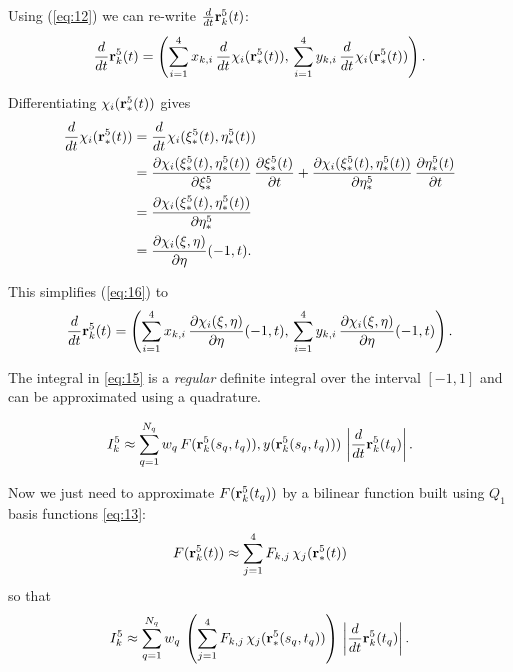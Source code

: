 \documentclass[11pt]{article}
\begin{document}
Using (\ref{eq:12}) we can re-write $\frac{d}{dt} \mathbf{r}_{k}^{5}(t)$:
\begin{equation}
\label{eq:16}
\frac{d}{dt} \mathbf{r}_{k}^{5}(t) = \left( \sum_{i=1}^{4} x_{k,i}\, \frac{d}{dt}\chi_{i}(\mathbf{r}_{*}^{5}(t)),\,
                                 \sum_{i=1}^{4} y_{k,i}\, \frac{d}{dt}\chi_{i}(\mathbf{r}_{*}^{5}(t))  \right).
\end{equation}

Differentiating $\chi_{i}(\mathbf{r}_{*}^{5}(t))$ gives
\begin{equation}
  \label{eq:17}
  \begin{aligned}
      \frac{d}{dt}\chi_{i}(\mathbf{r}_{*}^{5}(t)) &= \frac{d}{dt}\chi_{i}(\xi_{*}^{5}(t), \eta_{*}^{5}(t))\\
      &=\frac{\partial \chi_{i}(\xi_{*}^{5}(t), \eta_{*}^{5}(t))}{\partial \xi_{*}^{5}}\,\frac{\partial \xi_{*}^{5}(t)}{\partial t} +
      \frac{\partial \chi_{i}(\xi_{*}^{5}(t), \eta_{*}^{5}(t))}{\partial \eta_{*}^{5}}\,\frac{\partial \eta_{*}^{5}(t)}{\partial t}\\
      &= \frac{\partial \chi_{i}(\xi_{*}^{5}(t), \eta_{*}^{5}(t))}{\partial \eta_{*}^{5}}\\
      &=\frac{\partial \chi_{i}(\xi, \eta)}{\partial \eta}(-1, t).
  \end{aligned}
\end{equation}

This simplifies (\ref{eq:16}) to
\begin{equation}
  \label{eq:18}
\frac{d}{dt} \mathbf{r}_{k}^{5}(t) = \left( \sum_{i=1}^{4} x_{k,i}\,\frac{\partial \chi_{i}(\xi, \eta)}{\partial \eta}(-1, t),\,
                                 \sum_{i=1}^{4} y_{k,i}\,\frac{\partial \chi_{i}(\xi, \eta)}{\partial \eta}(-1, t) \right).
\end{equation}

The integral in \eqref{eq:15} is a \emph{regular} definite integral over
the interval $[-1, 1]$ and can be approximated using a quadrature.

\begin{equation}
\label{eq:19}
I_{k}^{5} \approx \sum_{q=1}^{N_{q}} w_{q}\, F(\mathbf{r}_{k}^{5}(s_{q}, t_{q})), y(\mathbf{r}_{k}^{5}(s_{q}, t_{q})))\, \left|\frac{d}{dt}\mathbf{r}_{k}^{5}(t_{q}) \right|.
\end{equation}

Now we just need to approximate $F(\mathbf{r}_{k}^{5}(t_{q}))$ by
a bilinear function built using $Q_{1}$ basis functions \eqref{eq:13}:
\begin{equation}
\label{eq:20}
F(\mathbf{r}_{k}^{5}(t)) \approx \sum_{j=1}^{4} F_{k,j}\, \chi_{j}(\mathbf{r}_{*}^{5}(t))
\end{equation}
so that
\begin{equation}
\label{eq:21}
I_{k}^{5} \approx \sum_{q=1}^{N_{q}} w_{q}\,
\left( \sum_{j=1}^{4} F_{k,j}\, \chi_{j}(\mathbf{r}_{*}^{5}(s_{q}, t_{q})) \right) \, \left| \frac{d}{dt}\mathbf{r}_{k}^{5}(t_{q}) \right|.
\end{equation}
\end{document}
